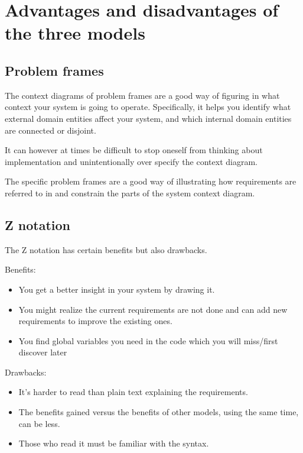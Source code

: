 \documentclass[Main_Assignment2]{subfiles}
\begin{document}
\section{Advantages and disadvantages of the three models}

	\subsection{Problem frames} %
	\label{sub:problem_frames}

	The context diagrams of problem frames are a good way of figuring in what context your system is going to operate.
	Specifically, it helps you identify what external domain entities affect your system, and which internal domain entities are connected or disjoint.

	It can however at times be difficult to stop oneself from thinking about implementation and unintentionally over specify the context diagram.

	The specific problem frames are a good way of illustrating how requirements are referred to in and constrain the parts of the system context diagram.



	\subsection{Z notation}
	The Z notation has certain benefits but also drawbacks.

Benefits:
\vspace{-10pt}
\begin{itemize}
	\item You get a better insight in your system by drawing it.
	\item You might realize the current requirements are not done and can add new requirements to improve the existing ones.
	\item You find global variables you need in the code which you will miss/first discover later
\end{itemize}

Drawbacks:
\vspace{-10pt}
\begin{itemize}
	\item It's harder to read than plain text explaining the requirements.
	\item The benefits gained versus the benefits of other models, using the same time, can be less.
	\item Those who read it must be familiar with the syntax.
\end{itemize}
\end{document}
